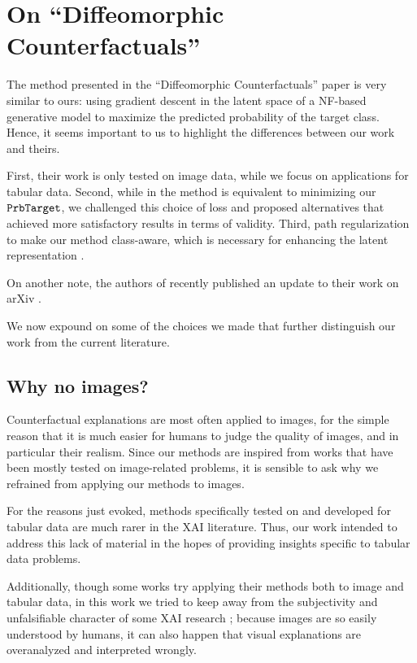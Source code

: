 \documentclass[../main.tex]{subfiles}
\begin{document}
\section{On ``Diffeomorphic Counterfactuals''}

The method presented in the ``Diffeomorphic Counterfactuals'' paper \cite{dombrowskiDiffeomorphic2021} is very similar to ours: using gradient descent in the latent space of a NF-based generative model to maximize the predicted probability of the target class.
Hence, it seems important to us to highlight the differences between our work and theirs.

First, their work is only tested on image data, while we focus on applications for tabular data.
Second, while in \cite{dombrowskiDiffeomorphic2021} the method is equivalent to minimizing our $\mathtt{PrbTarget}{}$, we challenged this choice of loss and proposed alternatives that achieved more satisfactory results in terms of validity.
Third, path regularization to make our method class-aware, which is necessary for enhancing the latent representation \cite{locatelloChallenging2019}.

On another note, the authors of \cite{dombrowskiDiffeomorphic2021} recently published an update to their work on arXiv \cite{dombrowskiDiffeomorphic2022}.

We now expound on some of the choices we made that further distinguish our work from the current literature.

\subsection{Why no images?}

Counterfactual explanations are most often applied to images, for the simple reason that it is much easier for humans to judge the quality of images, and in particular their realism.
Since our methods are inspired from works that have been mostly tested on image-related problems, it is sensible to ask why we refrained from applying our methods to images.

For the reasons just evoked, methods specifically tested on and developed for tabular data are much rarer in the XAI literature.
Thus, our work intended to address this lack of material in the hopes of providing insights specific to tabular data problems.

Additionally, though some works try applying their methods both to image and tabular data, in this work we tried to keep away from the subjectivity and unfalsifiable character of some XAI research \cite{leavittFalsifiable2020}; because images are so easily understood by humans, it can also happen that visual explanations are overanalyzed and interpreted wrongly.
\end{document}
